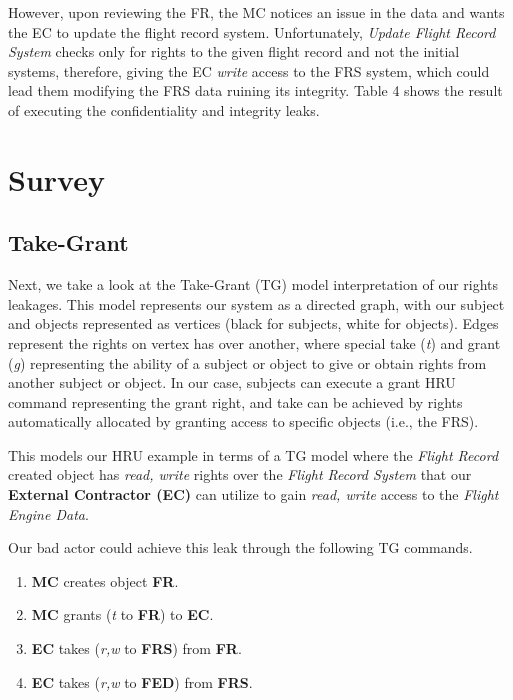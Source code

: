 \documentclass[10pt,journal,compsoc]{IEEEtran}
\begin{document}
  However, upon reviewing the FR, the MC notices an issue in the data and wants the EC to update the flight record system. 
  Unfortunately, \textit{Update Flight Record System} checks only for rights to the given flight record and not the initial systems, therefore, giving the EC \textit{write} access to the FRS system, which could lead them modifying the FRS data ruining its integrity.
  Table 4 shows the result of executing the confidentiality and integrity leaks. 

\section{Survey}

\subsection{Take-Grant}

Next, we take a look at the Take-Grant (TG) model interpretation of our rights leakages. 
This model represents our system as a directed graph, with our subject and objects represented as vertices (black for subjects, white for objects). 
Edges represent the rights on vertex has over another, where special take (\textit{t}) and grant (\textit{g}) representing the ability of a subject or object to give or obtain rights from another subject or object. 
In our case, subjects can execute a grant HRU command representing the grant right, and take can be achieved by rights automatically allocated by granting access to specific objects (i.e., the FRS).

This models our HRU example in terms of a TG model where the \textit{Flight Record} created object has \textit{read, write} rights over the \textit{Flight Record System} that our \textbf{External Contractor (EC)} can utilize to gain \textit{read, write} access to the \textit{Flight Engine Data}.

Our bad actor could achieve this leak through the following TG commands. 

\begin{enumerate}
  \item \textbf{MC} creates object \textbf{FR}.
  \item \textbf{MC} grants (\textit{t} to \textbf{FR}) to \textbf{EC}.
  \item \textbf{EC} takes (\textit{r,w} to \textbf{FRS}) from \textbf{FR}.
  \item \textbf{EC} takes (\textit{r,w} to \textbf{FED}) from \textbf{FRS}.
\end{enumerate}
\end{document}
